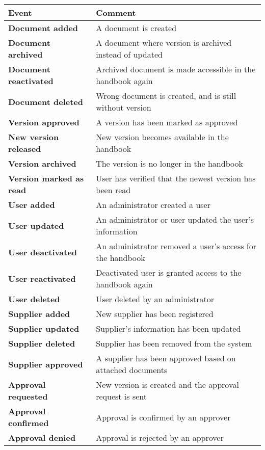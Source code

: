 \begin{table}[H]
	\centering
	\begin{tabular}{m{4.2 cm} l}
		\hline
		Event & Comment\\
		\hline
		\textbf{Document added} & A document is created\\
		\textbf{Document archived} & A document where version is archived instead of updated\\
		\textbf{Document reactivated} & Archived document is made accessible in the handbook again\\
		\textbf{Document deleted} & Wrong document is created, and is still without version\\
		\textbf{Version approved} & A version has been marked as approved\\
		\textbf{New version released} &  New version becomes available in the handbook\\
		\textbf{Version archived} & The version is no longer in the handbook\\
		\textbf{Version marked \newline as read} & User has verified that the newest version has been read\\
		\textbf{User added} & An administrator created a user\\
		\textbf{User updated} & An administrator or user updated the user's information\\
		\textbf{User deactivated} & An administrator removed a user's access for the handbook\\
		\textbf{User reactivated} & Deactivated user is granted access to the handbook again\\
		\textbf{User deleted} & User deleted by an administrator\\
		\textbf{Supplier added} & New supplier has been registered\\
		\textbf{Supplier updated} & Supplier's information has been updated\\
		\textbf{Supplier deleted} & Supplier has been removed from the system\\
		\textbf{Supplier approved} & A supplier has been approved based on attached documents\\
		\textbf{Approval requested} & New version is created and the approval request is sent\\
		\textbf{Approval confirmed} & Approval is confirmed by an approver\\
		\textbf{Approval denied} & Approval is rejected by an approver\\

\end{tabular}
\end{table}
